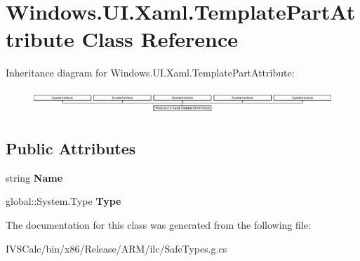 \hypertarget{class_windows_1_1_u_i_1_1_xaml_1_1_template_part_attribute}{}\section{Windows.\+U\+I.\+Xaml.\+Template\+Part\+Attribute Class Reference}
\label{class_windows_1_1_u_i_1_1_xaml_1_1_template_part_attribute}
Inheritance diagram for Windows.\+U\+I.\+Xaml.\+Template\+Part\+Attribute\+:\begin{figure}[H]
\begin{center}
\leavevmode
\includegraphics[height=0.929461cm]{class_windows_1_1_u_i_1_1_xaml_1_1_template_part_attribute}
\end{center}
\end{figure}
\subsection*{Public Attributes}
\begin{DoxyCompactItemize}
\item 
\mbox{\label{class_windows_1_1_u_i_1_1_xaml_1_1_template_part_attribute_a23a6077aef504ee692509d2ff5bea00d}} 
string {\bfseries Name}
\item 
\mbox{\label{class_windows_1_1_u_i_1_1_xaml_1_1_template_part_attribute_a1aa8d1771b12a7f2edc5cb17ec8f4114}} 
global\+::\+System.\+Type {\bfseries Type}
\end{DoxyCompactItemize}


The documentation for this class was generated from the following file\+:\begin{DoxyCompactItemize}
\item 
I\+V\+S\+Calc/bin/x86/\+Release/\+A\+R\+M/ilc/Safe\+Types.\+g.\+cs\end{DoxyCompactItemize}
